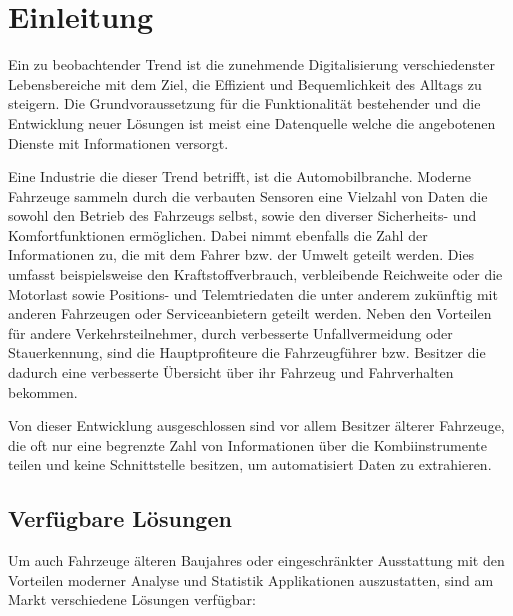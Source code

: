 \chapter{Einleitung}
Ein zu beobachtender Trend ist die zunehmende Digitalisierung verschiedenster Lebensbereiche mit dem Ziel, die Effizient und Bequemlichkeit des Alltags zu steigern. Die Grundvoraussetzung für die Funktionalität bestehender und die Entwicklung neuer Lösungen ist meist eine Datenquelle welche die angebotenen Dienste mit Informationen versorgt. 

Eine Industrie die dieser Trend betrifft, ist die Automobilbranche. Moderne Fahrzeuge sammeln durch die verbauten Sensoren eine Vielzahl von Daten die sowohl den Betrieb des Fahrzeugs selbst, sowie den diverser Sicherheits- und Komfortfunktionen ermöglichen. Dabei nimmt ebenfalls die Zahl der Informationen zu, die mit dem Fahrer bzw. der Umwelt geteilt werden. Dies umfasst beispielsweise den Kraftstoffverbrauch, verbleibende Reichweite oder die Motorlast sowie Positions- und Telemtriedaten die unter anderem zukünftig mit anderen Fahrzeugen oder Serviceanbietern geteilt werden. Neben den Vorteilen für andere Verkehrsteilnehmer, durch verbesserte Unfallvermeidung oder Stauerkennung, sind die Hauptprofiteure die Fahrzeugführer bzw. Besitzer die dadurch eine verbesserte Übersicht über ihr Fahrzeug und Fahrverhalten bekommen.

Von dieser Entwicklung ausgeschlossen sind vor allem Besitzer älterer Fahrzeuge, die oft nur eine begrenzte Zahl von Informationen über die Kombiinstrumente teilen und keine Schnittstelle besitzen, um automatisiert Daten zu extrahieren. 

\section{Verfügbare Lösungen}
\label{sec:solutions}
Um auch Fahrzeuge älteren Baujahres oder eingeschränkter Ausstattung mit den Vorteilen moderner Analyse und Statistik Applikationen auszustatten, sind am Markt verschiedene Lösungen verfügbar:


